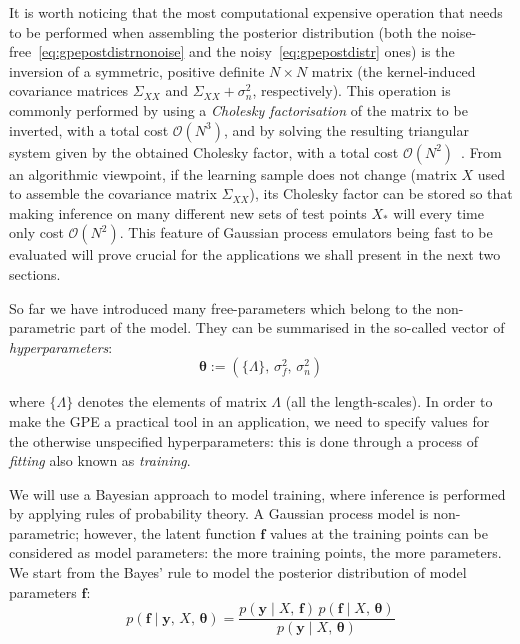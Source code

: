 \noindent
It is worth noticing that the most computational expensive operation that needs to be performed when assembling the posterior distribution (both the noise-free~\eqref{eq:gpepostdistrnonoise} and the noisy~\eqref{eq:gpepostdistr} ones) is the inversion of a symmetric, positive definite $N\times N$ matrix (the kernel-induced covariance matrices $\Sigma_{XX}$ and $\Sigma_{XX}+\sigma_n^2$, respectively). This operation is commonly performed by using a \textit{Cholesky factorisation} of the matrix to be inverted, with a total cost $\mathcal{O}(N^3)$, and by solving the resulting triangular system given by the obtained Cholesky factor, with a total cost $\mathcal{O}(N^2)$~\cite{Rasmussen:2006}. From an algorithmic viewpoint, if the learning sample does not change (matrix $X$ used to assemble the covariance matrix $\Sigma_{XX}$), its Cholesky factor can be stored so that making inference on many different new sets of test points $X_{*}$ will every time only cost $\mathcal{O}(N^2)$. This feature of Gaussian process emulators being fast to be evaluated will prove crucial for the applications we shall present in the next two sections.

\vspace{0.2cm}
So far we have introduced many free-parameters which belong to the non-parametric part of the model. They can be summarised in the so-called vector of \textit{hyperparameters}:
%
\begin{equation}
    \boldsymbol{\theta}:=(\{\Lambda\},\,\sigma_f^2,\,\sigma_n^2)    
\end{equation}

\noindent
where $\{\Lambda\}$ denotes the elements of matrix $\Lambda$ (all the length-scales). In order to make the GPE a practical tool in an application, we need to specify values for the otherwise unspecified hyperparameters: this is done through a process of \textit{fitting} also known as \textit{training}.

\vspace{0.2cm}
We will use a Bayesian approach to model training, where inference is performed by applying rules of probability theory. A Gaussian process model is non-parametric; however, the latent function $\mathbf{f}$ values at the training points can be considered as model parameters: the more training points, the more parameters. We start from the Bayes' rule to model the posterior distribution of model parameters $\mathbf{f}$:
%
\begin{equation}\label{eq:paramspostdistr}
    p(\mathbf{f}\;\vert\; \mathbf{y},\,X,\,\boldsymbol{\theta}) = \frac{p(\mathbf{y}\;\vert\; X,\,\mathbf{f})\,p(\mathbf{f}\;\vert\; X,\,\boldsymbol{\theta})}{p(\mathbf{y}\;\vert\; X,\,\boldsymbol{\theta})}    
\end{equation}

